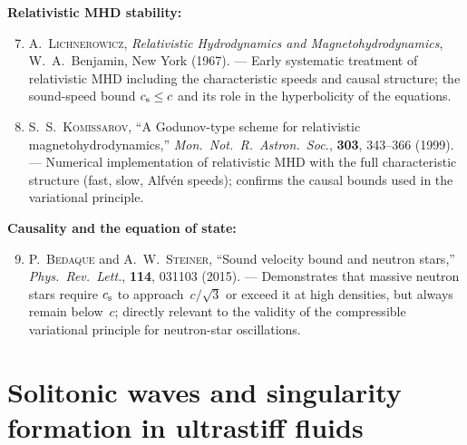 \medskip
\noindent\textbf{Relativistic MHD stability:}
\begin{enumerate}\setcounter{enumi}{6}
\item A.~\textsc{Lichnerowicz},
  \emph{Relativistic Hydrodynamics and Magnetohydrodynamics},
  W.~A.~Benjamin, New York (1967).
  --- Early systematic treatment of relativistic MHD including the
  characteristic speeds and causal structure; the sound-speed bound
  $c_{\mathrm{s}} \le c$ and its role in the hyperbolicity of the equations.
  \cite{Lichnerowicz1967}

\item S.~S.~\textsc{Komissarov},
  ``A Godunov-type scheme for relativistic magnetohydrodynamics,''
  \emph{Mon.\ Not.\ R.\ Astron.\ Soc.}, \textbf{303}, 343--366
  (1999).
  --- Numerical implementation of relativistic MHD with the full
  characteristic structure (fast, slow, Alfv\'en speeds); confirms
  the causal bounds used in the variational principle.
  \cite{Komissarov1999}
\end{enumerate}

\medskip
\noindent\textbf{Causality and the equation of state:}
\begin{enumerate}\setcounter{enumi}{8}
\item P.~\textsc{Bedaque} and A.~W.~\textsc{Steiner},
  ``Sound velocity bound and neutron stars,''
  \emph{Phys.\ Rev.\ Lett.}, \textbf{114}, 031103 (2015).
  --- Demonstrates that massive neutron stars require $c_{\mathrm{s}}$ to
  approach~$c/\!\sqrt{3}$ or exceed it at high densities, but always
  remain below~$c$; directly relevant to the validity of the
  compressible variational principle for neutron-star oscillations.
  \cite{Bedaque2015}
\end{enumerate}

\section{Solitonic waves and singularity formation in ultrastiff fluids}
\label{sec:rel-14-solitons}

